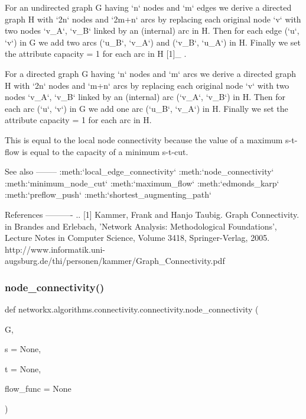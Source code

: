 \begin{DoxyVerb}
For an undirected graph G having `n` nodes and `m` edges we derive a
directed graph H with `2n` nodes and `2m+n` arcs by replacing each
original node `v` with two nodes `v_A`, `v_B` linked by an (internal)
arc in H. Then for each edge (`u`, `v`) in G we add two arcs
(`u_B`, `v_A`) and (`v_B`, `u_A`) in H. Finally we set the attribute
capacity = 1 for each arc in H [1]_ .

For a directed graph G having `n` nodes and `m` arcs we derive a
directed graph H with `2n` nodes and `m+n` arcs by replacing each
original node `v` with two nodes `v_A`, `v_B` linked by an (internal)
arc (`v_A`, `v_B`) in H. Then for each arc (`u`, `v`) in G we add one arc
(`u_B`, `v_A`) in H. Finally we set the attribute capacity = 1 for
each arc in H.

This is equal to the local node connectivity because the value of
a maximum s-t-flow is equal to the capacity of a minimum s-t-cut.

See also
--------
:meth:`local_edge_connectivity`
:meth:`node_connectivity`
:meth:`minimum_node_cut`
:meth:`maximum_flow`
:meth:`edmonds_karp`
:meth:`preflow_push`
:meth:`shortest_augmenting_path`

References
----------
.. [1] Kammer, Frank and Hanjo Taubig. Graph Connectivity. in Brandes and
    Erlebach, 'Network Analysis: Methodological Foundations', Lecture
    Notes in Computer Science, Volume 3418, Springer-Verlag, 2005.
    http://www.informatik.uni-augsburg.de/thi/personen/kammer/Graph_Connectivity.pdf\end{DoxyVerb}
 \mbox{\label{namespacenetworkx_1_1algorithms_1_1connectivity_1_1connectivity_a8db852a84139c51dcd040682fd93d6c2}} 
\subsubsection{\texorpdfstring{node\+\_\+connectivity()}{node\_connectivity()}}
{\footnotesize\ttfamily def networkx.\+algorithms.\+connectivity.\+connectivity.\+node\+\_\+connectivity (\begin{DoxyParamCaption}\item[{}]{G,  }\item[{}]{s = {\ttfamily None},  }\item[{}]{t = {\ttfamily None},  }\item[{}]{flow\+\_\+func = {\ttfamily None} }\end{DoxyParamCaption})}

